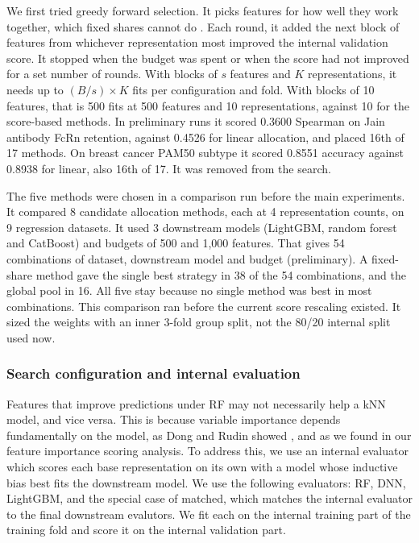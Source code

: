 We first tried greedy forward selection. It picks features for how well they work together, which fixed shares cannot do \citep{Kohavi1997, Guyon2003}. Each round, it added the next block of features from whichever representation most improved the internal validation score. It stopped when the budget was spent or when the score had not improved for a set number of rounds. With blocks of $s$ features and $K$ representations, it needs up to $(B/s) \times K$ fits per configuration and fold. With blocks of 10 features, that is 500 fits at 500 features and 10 representations, against 10 for the score-based methods. In preliminary runs it scored 0.3600 Spearman on Jain antibody FcRn retention, against 0.4526 for linear allocation, and placed 16th of 17 methods. On breast cancer PAM50 subtype it scored 0.8551 accuracy against 0.8938 for linear, also 16th of 17. It was removed from the search.

The five methods were chosen in a comparison run before the main experiments. It compared 8 candidate allocation methods, each at 4 representation counts, on 9 regression datasets. It used 3 downstream models (LightGBM, random forest and CatBoost) and budgets of 500 and 1,000 features. That gives 54 combinations of dataset, downstream model and budget (preliminary). A fixed-share method gave the single best strategy in 38 of the 54 combinations, and the global pool in 16. All five stay because no single method was best in most combinations. This comparison ran before the current score rescaling existed. It sized the weights with an inner 3-fold group split, not the 80/20 internal split used now.

\subsubsection{Search configuration and internal evaluation}

Features that improve predictions under RF may not necessarily help a kNN model, and vice versa. This is because variable importance depends fundamentally on the model, as Dong and Rudin showed \citep{Dong2020}, and as we found in our feature importance scoring analysis. To address this, we use an internal evaluator which scores each base representation on its own with a model whose inductive bias best fits the downstream model. We use the following evaluators: RF, DNN, LightGBM, and the special case of matched, which matches the internal evaluator to the final downstream evalutors. We fit each on the internal training part of the training fold and score it on the internal validation part.

